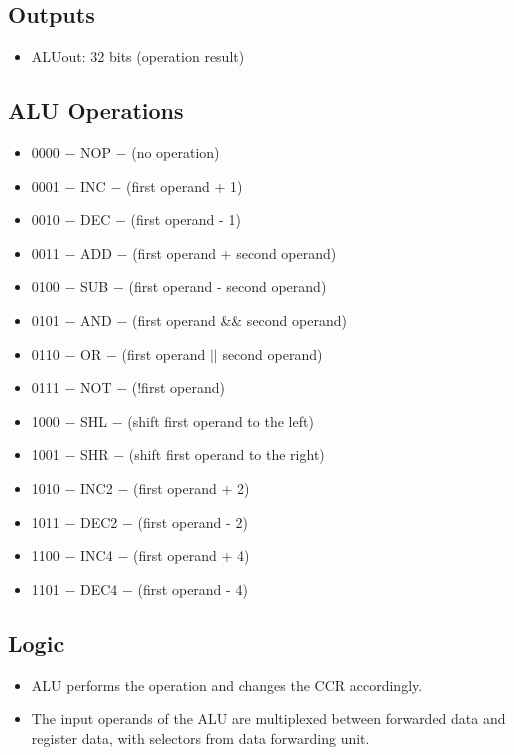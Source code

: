 \documentclass[12pt]{report}
\begin{document}
\subsection{Outputs}
\begin{itemize}
    \item ALUout: 32 bits (operation result)
\end{itemize}

\subsection{ALU Operations}
\begin{itemize}
    \item 0000 $-$ NOP $-$ (no operation)
    \item 0001 $-$ INC $-$ (first operand + 1)
    \item 0010 $-$ DEC $-$ (first operand - 1)
    \item 0011 $-$ ADD $-$ (first operand + second operand)
    \item 0100 $-$ SUB $-$ (first operand - second operand)
    \item 0101 $-$ AND $-$ (first operand \&\& second operand)
    \item 0110 $-$ OR $-$ (first operand $||$ second operand)
    \item 0111 $-$ NOT $-$ (!first operand)
    \item 1000 $-$ SHL $-$ (shift first operand to the left)
    \item 1001 $-$ SHR $-$ (shift first operand to the right)
    \item 1010 $-$ INC2 $-$ (first operand + 2)
    \item 1011 $-$ DEC2 $-$ (first operand - 2)
    \item 1100 $-$ INC4 $-$ (first operand + 4)
    \item 1101 $-$ DEC4 $-$ (first operand - 4)
\end{itemize}

\subsection{Logic}
\begin{itemize}
    \item ALU performs the operation and changes the CCR accordingly.
    \item The input operands of the ALU are multiplexed between forwarded data and register data, with selectors from data forwarding unit.
\end{itemize}
\end{document}
